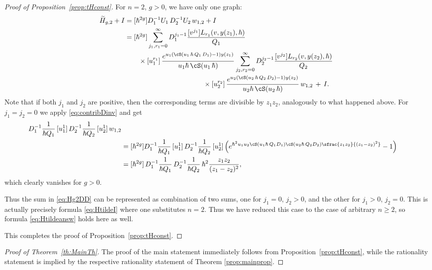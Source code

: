 \begin{proof}[Proof of Proposition~\ref{prop:tHconst}]
For $n=2$, $g>0$, we have only one graph:\vspace*{-3pt}
\begin{equation}\label{eq:Hg2DD}
\begin{aligned}
\widetilde{H}_{g,2}+I &=[\hbar^{2g}]D_1^{-1} U_1\, D_2^{-1} U_2\, w_{1,2} +I \\
&=[\hbar^{2g}]\sum_{j_1,r_1=0}^\infty D_1^{j_1-1}\frac{[v^{j_1}]L_{r_1}(v,y(z_1),\hbar)}{Q_1}\\
&\qquad\times[u_1^{r_1}]\, \frac{e^{u_1(\cS(u_1\,\hbar\,Q_1\,D_1)-1)y(z_1)}}{u_1\hbar\,\cS(u_1\,\hbar)}
\sum_{j_2,r_2=0}^\infty D_2^{j_2-1}\frac{[v^{j_2}]L_{r_2}(v,y(z_2),\hbar)}{Q_2}\\
&\hspace*{4cm}\times[u_2^{r_2}]\, \frac{e^{u_2(\cS(u_2\,\hbar\,Q_2\,D_2)-1)y(z_2)}}{u_2\hbar\,\cS(u_2\,\hbar)}\,w_{1,2}\,+\,I.
\end{aligned}
\end{equation}
Note that if both $j_1$ and $j_2$ are positive, then the corresponding terms are divisible by $z_1z_2$, analogously to what happened above. For $j_1=j_2=0$ we apply \eqref{eq:contribDinv} and get\vspace*{-3pt}
\begin{align*}
[\hbar&^{2g}]D_{1}^{-1}\frac{1}{\hbar Q_1}\,[u_1^1]\,D_{2}^{-1}\frac{1}{\hbar Q_2}\,[u_2^1]\, w_{1,2}\\ &= [\hbar^{2g}]D_{1}^{-1}\frac{1}{\hbar Q_1}\,[u_1^1]\,D_{2}^{-1}\frac{1}{\hbar Q_2}\,[u_2^1]\, \Bigl(e^{\hbar^2u_1u_2\cS(u_1\hbar\,Q_1 D_1)\cS(u_2\hbar\,Q_2 D_2) \sfrac{z_1 z_2}{(z_1-z_2)^2}}-1 \Bigr)\\
&= [\hbar^{2g}]\,D_{1}^{-1}\frac{1}{\hbar Q_1}\,D_{2}^{-1}\frac{1}{\hbar Q_2}\, \hbar^2\frac{z_1 z_2}{(z_1-z_2)^2},
\end{align*}
which clearly vanishes for $g>0$.

Thus the sum in \eqref{eq:Hg2DD} can be represented as combination of two sums, one for $j_1=0$, $j_2>0$, and the other for $j_1>0$, $j_2=0$. This is actually precisely formula \eqref{eq:HtildeI} where one substitutes $n=2$. Thus we have reduced this case to the case of arbitrary $n\geq2$, so formula \eqref{eq:Htildeansw} holds here as well.

This completes the proof of Proposition~\ref{prop:tHconst}.
\end{proof}
\begin{proof}[Proof of Theorem~\ref{th:MainTh}]
The proof of the main statement immediately follows from Proposition~\ref{prop:tHconst}, while the rationality statement is implied by the respective rationality statement of Theorem \ref{prop:mainprop}.
\end{proof}

